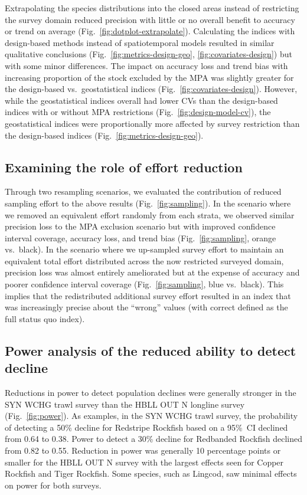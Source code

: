 \documentclass[12pt]{article}
\newcommand{\R}[1]{\label{#1}\linelabel{#1}}
\begin{document}
\begin{spacing}{1.4}
Extrapolating the species distributions into the closed areas instead of restricting the survey domain reduced precision with little or no overall benefit to accuracy or trend on average (Fig.~\ref{fig:dotplot-extrapolate}).
Calculating the indices with design-based methods instead of spatiotemporal models resulted in similar qualitative conclusions (Fig.~\ref{fig:metrics-design-geo}, \ref{fig:covariates-design}) but with some minor differences.
\R{B16}The impact on accuracy loss and trend bias with increasing proportion of the stock excluded by the MPA was slightly greater for the design-based vs.\ geostatistical indices (Fig.~\ref{fig:covariates-design}).
However, while the geostatistical indices overall had lower CVs than the design-based indices with or without MPA restrictions (Fig.~\ref{fig:design-model-cv}), the geostatistical indices were proportionally more affected by survey restriction than the design-based indices (Fig.~\ref{fig:metrics-design-geo}).

\subsection*{Examining the role of effort reduction}

Through two resampling scenarios, we evaluated the contribution of reduced sampling effort to the above results (Fig.~\ref{fig:sampling}).
In the scenario where we removed an equivalent effort randomly from each strata, we observed similar precision loss to the MPA exclusion scenario but with improved confidence interval coverage, accuracy loss, and trend bias (Fig.~\ref{fig:sampling}, orange vs.\ black).
In the scenario where we up-sampled survey effort to maintain an equivalent total effort distributed across the now restricted surveyed domain,
precision loss was almost entirely ameliorated but at the expense of accuracy and poorer confidence interval coverage (Fig.~\ref{fig:sampling}, blue vs.\ black).
This implies that the redistributed additional survey effort resulted in an index that was increasingly precise about the ``wrong'' values (with correct defined as the full status quo index).

\subsection*{Power analysis of the reduced ability to detect decline}

Reductions in power to detect population declines were generally stronger in the SYN WCHG trawl survey than the HBLL OUT N longline survey (Fig.~\ref{fig:power}).
As examples, in the SYN WCHG trawl survey, the probability of detecting a 50\% decline for Redstripe Rockfish based on a 95\%~CI declined from 0.64 to 0.38.
Power to detect a 30\% decline for Redbanded Rockfish declined from 0.82 to 0.55.
Reduction in power was generally 10 percentage points or smaller for the HBLL OUT N survey with the largest effects seen for Copper Rockfish and Tiger Rockfish.
Some species, such as Lingcod, saw minimal effects on power for both surveys.


\end{spacing}
\end{document}
